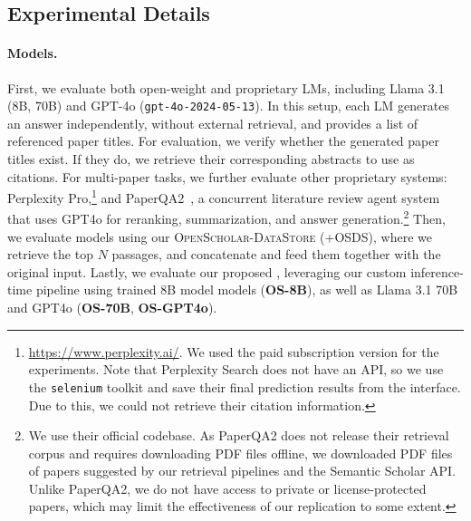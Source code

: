 \label{sec:results}

\subsection{Experimental Details}
\paragraph{Models.}
First, we evaluate both open-weight and proprietary LMs, including Llama 3.1 (8B, 70B) and GPT-4o (\texttt{gpt-4o-2024-05-13}). In this setup, each LM generates an answer independently, without external retrieval, and provides a list of referenced paper titles. For evaluation, we verify whether the generated paper titles exist. If they do, we retrieve their corresponding abstracts to use as citations. 
For multi-paper tasks, we further evaluate other proprietary systems: Perplexity Pro,\footnote{\url{https://www.perplexity.ai/}. We used the paid subscription version for the experiments. Note that Perplexity Search does not have an API, so we use the \texttt{selenium} toolkit and save their final prediction results from the interface. Due to this, we could not retrieve their citation information.} and PaperQA2~\citep{skarlinski2024language}, a concurrent literature review agent system that uses GPT4o for reranking, summarization, and answer generation.\footnote{We use their official codebase. As PaperQA2 does not release their retrieval corpus and requires downloading PDF files offline, we downloaded PDF files of papers suggested by our retrieval pipelines and the Semantic Scholar API. Unlike PaperQA2, we do not have access to private or license-protected papers, which may limit the effectiveness of our replication to some extent.}  
Then, we evaluate models using our \textsc{OpenScholar-DataStore} (+OSDS), where we retrieve the top $N$ passages, and concatenate and feed them together with the original input.  
Lastly, we evaluate our proposed \model, leveraging our custom inference-time pipeline using trained 8B model models ({\bf OS-8B}), as well as Llama 3.1 70B and GPT4o ({\bf OS-70B}, {\bf OS-GPT4o}).  

